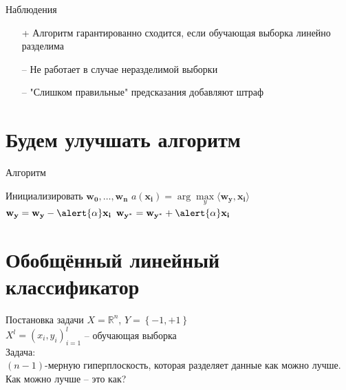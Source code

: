 \documentclass[10pt]{beamer}
\begin{document}
\begin{frame} {Наблюдения}
    \begin{itemize} [<+->]
      \item[+] Алгоритм гарантированно сходится, если обучающая выборка линейно разделима
      \bigbreak
      \item[--] Не работает в случае неразделимой выборки 
      \item[--] "Слишком правильные" предсказания добавляют штраф      %
    \end{itemize}
\end{frame}

\section{Будем улучшать алгоритм}

\begin{frame}{Алгоритм}
	\begin{algorithmic}[1]
            \State Инициализировать ${\mathbf{w_0}, \dots, \mathbf{w_n}}$
                 \State $a(\mathbf{x_i}) = \arg\max\limits_{y} \langle \mathbf{w_y}, \mathbf{x_i} \rangle$                 
                   \State $\mathbf{w_y} = \mathbf{w_y} - \alert{\alpha} \mathbf{x_i}$
                   \State $\mathbf{w_{y^{*}}} = \mathbf{w_{y^{*}}} + \alert{\alpha} \mathbf{x_i}$
                 \EndIf  
               \EndFor
           	\EndRepeat
        \EndFunction
    \end{algorithmic}
\end{frame}

\section{Обобщённый линейный классификатор}

\begin{frame}{Постановка задачи}
  $X = \mathbb{R}^n$, ${Y = \left\{ -1, + 1\right\}}$\\
  ${X^l = (x_i, y_i)_{i = 1}^l}$ -- обучающая выборка\\
  \bigbreak
  \alert{Задача}:\\
  $(n-1)$-мерную гиперплоскость, которая разделяет данные \alert{как можно лучше}.
  \bigbreak \pause
  Как можно лучше -- это как?
\end{frame}
\end{document}
